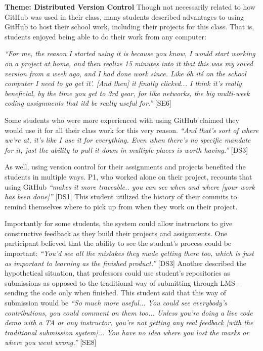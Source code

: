 \textbf{Theme: Distributed Version Control} \break
Though not necessarily related to how GitHub was used in their class, many students described advantages to using GitHub to host their school work, including their projects for this class. That is, students enjoyed being able to do their work from any computer:

\textit{``For me, the reason I started using it is because you know, I would start working on a project at home, and then realize 15 minutes into it that this was my saved version from a week ago, and I had done work since. Like \'oh it\'s on the school computer I need to go get it'. [And then] it finally clicked... I think it's really beneficial, by the time you get to 3rd year, for like networks, the big multi-week coding assignments that it\'d be really useful for.''} [SE6]

Some students who were more experienced with using GitHub claimed they would use it for all their class work for this very reason. \textit{``And that's sort of where we're at, it's like I use it for everything. Even when there's no specific mandate for it, just the ability to pull it down in multiple places is worth having.''} [DS3]

As well, using version control for their assignments and projects benefited the students in multiple ways. P1, who worked alone on their project, recounts that using GitHub \textit{``makes it more traceable.. you can see when and where [your work has been done]''} [DS1] This student utilized the history of their commits to remind themselves where to pick up from when they work on their project.

Importantly for some students, the system could allow instructors to give constructive feedback as they build their projects and assignments. One participant believed that the ability to see the student's process could be important: \textit{``You'd see all the mistakes they made getting there too, which is just as important to learning as the finished product.''} [DS3] Another described the hypothetical situation, that professors could use student's repositories as submissions as opposed to the traditional way of submitting through LMS - sending the code only when finished. This student said that this way of submission would be \textit{``So much more useful... You could see everybody's contributions, you could comment on them too... Unless you're doing a live code demo with a TA or any instructor, you're not getting any real feedback [with the traditional submission system]... You have no idea where you lost the marks or where you went wrong.''} [SE8]

